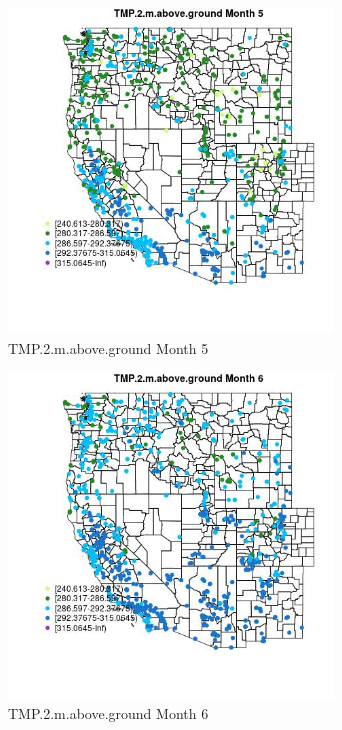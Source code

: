 \begin{figure} 
\centering  
\includegraphics[width=0.77\textwidth]{Code_Outputs/Report_ML_input_PM25_Step4_part_e_de_duplicated_aves_compiled_2019-05-21wNAs_MapObsMo5TMP2maboveground.jpg} 
\caption{\label{fig:Report_ML_input_PM25_Step4_part_e_de_duplicated_aves_compiled_2019-05-21wNAsMapObsMo5TMP2maboveground}TMP.2.m.above.ground Month 5} 
\end{figure} 
 

\begin{figure} 
\centering  
\includegraphics[width=0.77\textwidth]{Code_Outputs/Report_ML_input_PM25_Step4_part_e_de_duplicated_aves_compiled_2019-05-21wNAs_MapObsMo6TMP2maboveground.jpg} 
\caption{\label{fig:Report_ML_input_PM25_Step4_part_e_de_duplicated_aves_compiled_2019-05-21wNAsMapObsMo6TMP2maboveground}TMP.2.m.above.ground Month 6} 
\end{figure} 
 


